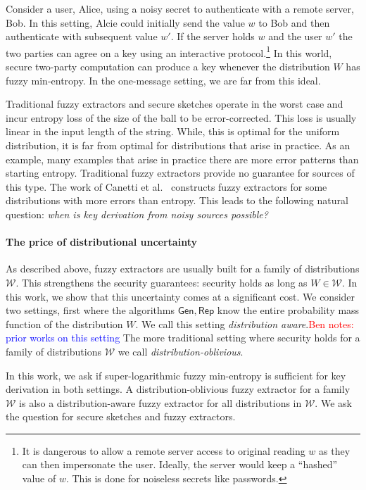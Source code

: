 \documentclass[11pt]{article}
\newcommand{\class}[1]{{\ensuremath{\mathsf{#1}}}}
\newcommand{\gen}{\ensuremath{\class{Gen}}\xspace}
\newcommand{\rep}{\ensuremath{\class{Rep}}\xspace}
\newcommand{\authnote}[2]{{\textcolor{red}{\textsf{#1 notes: }\textcolor{blue}{ #2}}\marginpar{\textcolor{red}{\textbf{!!!!!}}}}}
\newcommand{\authnote}[2]{}
\newcommand{\bnote}[1]{{\authnote{Ben}{#1}}}
\begin{document}
Consider a user, Alice, using a noisy secret to authenticate with a remote server, Bob.  In this setting, Alcie could initially send the value $w$ to Bob and then authenticate with subsequent value $w'$.  If the server holds $w$ and the user $w'$ the two parties can agree on a key using an interactive protocol.\footnote{It is dangerous to allow a remote server access to original reading $w$ as they can then impersonate the user.  Ideally, the server would keep a ``hashed'' value of $w$.  This is  done for noiseless secrets like passwords.}  In this world, secure two-party computation can produce a key whenever the distribution $W$ has fuzzy min-entropy.
In the one-message setting, we are far from this ideal.


Traditional fuzzy extractors and secure sketches operate in the worst case and incur entropy loss of the size of the ball to be error-corrected.  This loss is usually linear in the input length of the string.  While, this is optimal for the uniform distribution, it is far from optimal for distributions that arise in practice.  As an example, many examples that arise in practice there are more error patterns than starting entropy.  Traditional fuzzy extractors provide no guarantee for sources of this type.  The work of Canetti et al.~\cite{canetti2014key} constructs fuzzy  extractors for some distributions with more errors than entropy.  This leads to the following natural question: \emph{when is key derivation from noisy sources possible?}

\paragraph{The price of distributional uncertainty}
As described above, fuzzy extractors are usually built for a family of distributions $\mathcal{W}$.  This strengthens the security guarantees: security holds as long as $W\in\mathcal{W}$.  In this work, we show that this uncertainty comes at a significant cost.  We consider two settings, first where the algorithms $\gen, \rep$ know the entire probability mass function of the distribution $W$.  We call this setting \emph{distribution aware}.\bnote{prior works on this setting}  The more traditional setting where security holds for a family of distributions $\mathcal{W}$ we call \emph{distribution-oblivious}.

In this work, we ask if super-logarithmic fuzzy min-entropy is sufficient for key derivation in both settings.  A distribution-oblivious fuzzy extractor for a family $\mathcal{W}$ is also a distribution-aware fuzzy extractor for all distributions in $\mathcal{W}$.   We ask the question for secure sketches and fuzzy extractors.
\end{document}
